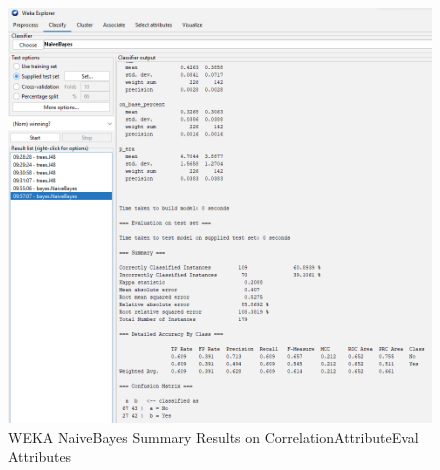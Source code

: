 \documentclass[12pt]{article}
\begin{document}
\newpage
\begin{figure}[h!]
    \includegraphics[scale=0.4]{./images/CorrelationAttributeEval/NaiveBayes-Summary.png}
\centering
    \caption{WEKA NaiveBayes Summary Results on CorrelationAttributeEval Attributes}
\end{figure}

\newpage
\end{document}
